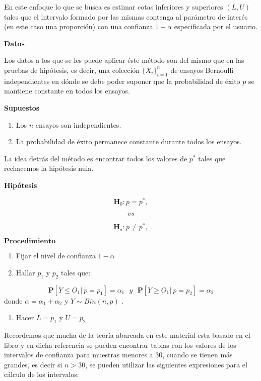 \documentclass[
  a4paper,
  oneside,
  openany]{book}
\providecommand{\tightlist}{%
  \setlength{\itemsep}{0pt}\setlength{\parskip}{0pt}}
\begin{document}
En este enfoque lo que se busca es estimar cotas inferiores y superiores \((L,U)\) tales que el intervalo formado por las mismas contenga al parámetro de interés (en este caso una proporción) con una confianza \(1-\alpha\) especificada por el usuario.

\textbf{Datos}

Los datos a los que se les puede aplicar éste método son del mismo que en las pruebas de hipótesis, es decir, una colección \(\{X_{i}\}_{i=1}^n\) de ensayos Bernoulli independientes en dónde se debe poder suponer que la probabilidad de éxito \(p\) se mantiene constante en todos los ensayos.

\textbf{Supuestos}

\begin{enumerate}
\def\labelenumi{\arabic{enumi})}
\item
  Los \(n\) ensayos son independientes.
\item
  La probabilidad de éxito permanece constante durante todos los ensayos.
\end{enumerate}

La idea detrás del método es encontrar todos los valores de \(p^*\) tales que rechacemos la hipótesis nula.

\textbf{Hipótesis}

\[\textbf{H}_{0}: p = p^*,\]

\[vs\]

\[\textbf{H}_{a}: p \neq p^*,\]

\(\mathbf{Procedimiento}\)

\begin{enumerate}
\def\labelenumi{\arabic{enumi})}
\item
  Fijar el nivel de confianza \(1-\alpha\)
\item
  Hallar \(p_{1}\) y \(p_{2}\) tales que:
\end{enumerate}

\[\mathbf{P}[Y\leq O_{1}| \ p=p_{1}]= \alpha_{1} \ \ \ y \ \ \ \mathbf{P}[Y\geq O_{1}| \ p=p_{2}]= \alpha_{2} \]
donde \(\alpha=\alpha_{1}+\alpha_{2}\) y \(Y \sim Bin (n,p)\) .

\begin{enumerate}
\def\labelenumi{\arabic{enumi})}
\setcounter{enumi}{2}
\tightlist
\item
  Hacer \(L= p_{1}\) y \(U=p_{2}\)
\end{enumerate}

Recordemos que mucha de la teoría abarcada en este material esta basado en el libro \citet{conover1998practical} y en dicha referencia se pueden encontrar tablas con los valores de los intervalos de confianza para muestras menores a 30, cuando se tienen más grandes, es decir si \(n>30\), se pueden utilizar las siguientes expresiones para el cálculo de los intervalos:
\end{document}
